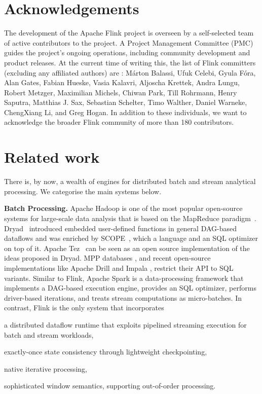 \documentclass[11pt]{article}
\newcommand{\para}[1]{\vspace{2mm}\noindent\textbf{#1}}
\begin{document}
\vspace{-4mm}
\section{Acknowledgements}
\vspace{-2mm}
\label{sec:acknowledgements}
The development of the Apache Flink project is overseen by a self-selected team of active contributors to the project. A Project Management Committee (PMC) guides the project's ongoing operations, including community development and product releases. At the current time of writing this, the list of Flink committers (excluding any affiliated authors) are : M\'arton Balassi, Ufuk Celebi, Gyula F\'ora, Alan Gates, Fabian Hueske, Vasia Kalavri, Aljoscha Krettek, Andra Lungu, Robert Metzger, Maximilian Michels, Chiwan Park, Till Rohrmann, Henry Saputra, Matthias J. Sax, Sebastian Schelter, Timo Walther, Daniel Warneke, ChengXiang Li, and Greg Hogan. In addition to these individuals, we want to acknowledge the broader Flink community of more than 180 contributors. 

\vspace{-4mm}
\section{Related work}
\vspace{-2mm}
\label{sec:related}
There is, by now, a wealth of engines for distributed batch and stream analytical processing. We categorise the main systems below. 

\para{Batch Processing.} Apache Hadoop is one of the most popular open-source systems for large-scale data analysis that is based on the MapReduce paradigm~\cite{DBLP:journals/cacm/DeanG08}. Dryad~\cite{isard2007dryad} introduced embedded user-defined functions in general DAG-based dataflows and was enriched by SCOPE~\cite{scopeOptimizer}, which a language and an SQL optimizer on top of it. Apache Tez~\cite{saha2015apache} can be seen as an open source implementation of the ideas proposed in Dryad. MPP databases \cite{dewitt1990gamma}, and recent open-source implementations like Apache Drill and Impala \cite{kornacker2015impala}, restrict their API to SQL variants. Similar to Flink, Apache Spark \cite{DBLP:conf/hotcloud/ZahariaCFSS10} is a data-processing framework that implements a DAG-based execution engine, provides an SQL optimizer, performs driver-based iterations, and treats stream computations as micro-batches. In contrast, Flink is the only system that incorporates
\begin{inparaenum}[i)]
  \item a distributed dataflow runtime that exploits pipelined streaming execution for batch and stream workloads,
  \item exactly-once state consistency through lightweight checkpointing,
  \item native iterative processing,
  \item sophisticated window semantics, supporting out-of-order processing.
\end{inparaenum}
\end{document}

